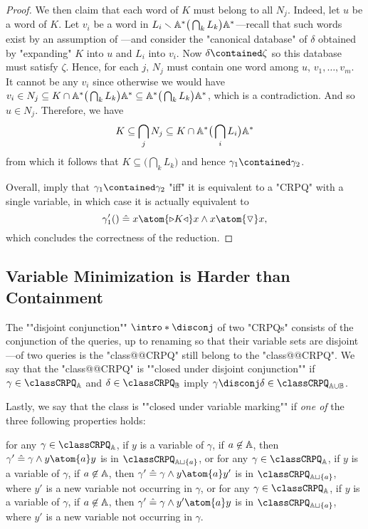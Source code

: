 \begin{proof}
	We then claim that each word of $K$ must belong to all $N_j$.
	Indeed, let $u$ be a word of $K$. Let $v_i$ be a word in
	$L_i \smallsetminus \mathbb{A}^* \big(\bigcap_k L_k\big) \mathbb{A}^*$---recall
	that such words exist by an assumption of ---and
	consider the "canonical database" of $\delta$ obtained by "expanding"
	$K$ into $u$ and $L_i$ into $v_i$.
	Now $\delta \contained \zeta$ so this database must satisfy $\zeta$.
	Hence, for each $j$, $N_j$ must contain one word among $u$, $v_1, \hdots,v_m$.
	It cannot be any $v_i$ since otherwise we would have $v_i \in N_j \subseteq
	K \cap \mathbb{A}^* \big(\bigcap_k L_k\big) \mathbb{A}^* \subseteq \mathbb{A}^* \big(\bigcap_k L_k\big) \mathbb{A}^*$, which is a contradiction. And so $u \in N_j$.
	Therefore, we have
	\[
		K \subseteq \bigcap_j N_j \subseteq K \cap \mathbb{A}^* \big(\bigcap_i L_i\big) \mathbb{A}^*
	\]
	from which it follows that $K \subseteq \big(\bigcap_k L_k\big)$ and hence
	$\gamma_1 \contained \gamma_2$.
	
	Overall,
	imply that $\gamma_1 \contained \gamma_2$ "iff" it is equivalent
	to a "CRPQ" with a single variable, in which case it is actually equivalent to
	\[\gamma'_1() \defeq x \atom{\triangleright K \triangleleft} x
		\land x \atom{\marking} x,\]
	which concludes the correctness of the reduction.
\end{proof}

\subsection{Variable Minimization is Harder than Containment}

The \AP""disjoint conjunction"" \AP$\intro*\disconj$ of two "CRPQs" consists of
the conjunction of the queries, up to renaming so that their variable sets are disjoint---of two queries is 
the "class@@CRPQ" still belong to the "class@@CRPQ".
We say that the "class@@CRPQ" is \AP""closed under disjoint conjunction""
if $\gamma \in \classCRPQ_\A$ and $\delta \in \classCRPQ_\B$
imply $\gamma \disconj \delta \in \classCRPQ_{\A \cup \B}$.

Lastly, we say that the class is \AP""closed under variable marking""
if \emph{one of} the three following properties holds: 
\begin{description}
	\itemAP[\intro*\axiomVarMarkingLoop] for any $\gamma \in \classCRPQ_{\A}$, if $y$ is a variable of $\gamma$,
		if $a\not\in\mathbb{A}$, then $\gamma' \defeq \gamma \land y \atom{a} y$
		is in $\classCRPQ_{\A\sqcup\{a\}}$, or
	\itemAP[\intro*\axiomVarMarkingOut] for any $\gamma \in \classCRPQ_{\A}$, if $y$ is a variable of $\gamma$,	
		if $a\not\in\mathbb{A}$, then $\gamma' \defeq \gamma \land y \atom{a} y'$
		is in $\classCRPQ_{\A\sqcup\{a\}}$,
		where $y'$ is a new variable not occurring in $\gamma$, or
	\itemAP[\intro*\axiomVarMarkingIn] for any $\gamma \in \classCRPQ_{\A}$, if $y$ is a variable of $\gamma$,	
		if $a\not\in\mathbb{A}$, then $\gamma' \defeq \gamma \land y' \atom{a} y$
		is in $\classCRPQ_{\A\sqcup\{a\}}$,
		where $y'$ is a new variable not occurring in $\gamma$.
\end{description}

